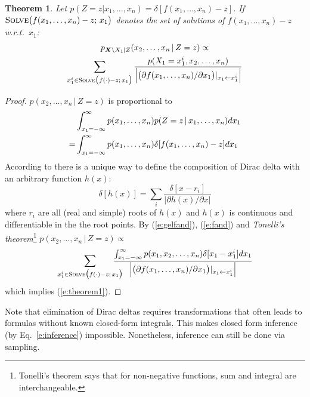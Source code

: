 \documentclass{article}
\newtheorem{theorem}{Theorem}
\newcommand{\pr}{p}
\begin{document}
\begin{theorem} 
\label{theorem1}
Let {\footnotesize $\pr(Z\!=\!z | x_1, \ldots, x_n) = \delta[f(x_1, \ldots, x_n)-z]$}.
If {\footnotesize$\textsc{Solve}\big( f(x_1, \ldots, x_n) - z ; \, x_1 \big)$} denotes the set of solutions of 
$f(x_1, \ldots, x_n)-z$ w.r.t.\ $x_1$:
\begin{multline}
\label{e:theorem1}
p_{\boldsymbol{X}\backslash X_1 | Z}(x_2, \ldots, x_n \,|\, Z=z) \propto \\
\sum_{x_1^i \in \textsc{Solve}\big( f(\cdot) - z ; \, x_1 \big)} 
\frac{p(X_1=x_1^i, x_2, \ldots, x_n)}
{\Big|\big(\partial f(x_1, \ldots, x_n) / \partial x_1 \big)|_{x_1 \leftarrow x_1^i} \Big|}
\end{multline}
\end{theorem}
\begin{proof}
$p(x_2, \ldots, x_n \,|\, Z=z)$ is proportional to
\begin{align}
%
%
%
&\int_{x_1=-\infty}^{\infty}p(x_1, \ldots, x_n)p(Z=z \,|\, x_1, \ldots, x_n) dx_1 \notag\\
%
=&\int_{x_1=-\infty}^{\infty}p(x_1, \ldots, x_n)
\delta[f(x_1, \ldots, x_n) - z] dx_1 
\label{e:fand}
\end{align}
According to \cite{gel1964generalized}
there is a unique way to define the composition of Dirac delta with 
an arbitrary function $h(x)$:
\begin{equation}
\label{e:gelfand}
\delta[h(x)] = \sum_{i} \frac{\delta[x - r_i]}{|\partial h(x)/\partial x|}
\end{equation}
where $r_i$ are all (real and simple) roots of $h(x)$ and $h(x)$ is continuous and differentiable in the the root points. By (\ref{e:gelfand}), (\ref{e:fand}) and 
\emph{Tonelli's theorem}\footnote{Tonelli's theorem says that for non-negative functions, sum and integral are interchangeable.} 
$\pr(x_2, \ldots, x_n \,|\, Z = z) \propto$
\begin{equation*}
\sum_{x_1^i \in \textsc{Solve}\big( f(\cdot) - z ; \, x_1 \big)} \!\!\!\!\!\!\!\!
\frac{\int_{x_1 = -\infty}^{\infty} p(x_1, x_2, \ldots, x_n)  \delta[x_1 - x_1^i] d x_1}
{\Big|\big(\partial f(x_1, \ldots, x_n) / \partial x_1 \big)|_{x_1 \leftarrow x_1^i} \Big|}
\end{equation*}
which implies (\ref{e:theorem1}).
\end{proof}
%
Note that elimination of Dirac deltas requires transformations 
that often leads to formulas without known closed-form integrals.
This makes closed form inference (by Eq.~\ref{e:inference}) impossible.
Nonetheless, inference can still be done via sampling.
\end{document}
